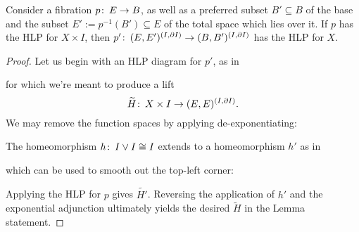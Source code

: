 \begin{lemma}\label{HLPsForPairsVsPtds}%
Consider a fibration $p\colon\thinspace E \to B$, as well as a preferred subset $B' \subseteq B$ of the base and the subset $E' := p^{-1}(B') \subseteq E$ of the total space which lies over it.
If $p$ has the HLP for $X \times I$, then $p'\colon\thinspace (E, E')^{(I, \partial I)} \to (B, B')^{(I, \partial I)}$ has the HLP for $X$.
\end{lemma}
\begin{proof}
Let us begin with an HLP diagram for $p'$, as in
\begin{center}
\end{center}
for which we're meant to produce a lift \[\widetilde H\colon\thinspace X \times I \to (E, E)^{(I, \partial I)}.\]
We may remove the function spaces by applying de-exponentiating:
\begin{center}
\end{center}
The homeomorphism $h\colon\thinspace I \vee I \cong I$ extends to a homeomorphism $h'$ as in
\begin{center}
\end{center}
which can be used to smooth out the top-left corner:
\begin{center}
\end{center}
Applying the HLP for $p$ gives $\widetilde{H'}$.  Reversing the application of $h'$ and the exponential adjunction ultimately yields the desired $\widetilde{H}$ in the Lemma statement.
\end{proof}

